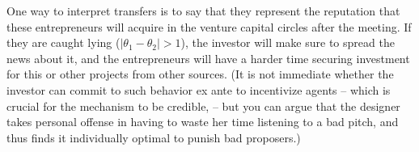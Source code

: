 \documentclass[a4paper]{article}
\begin{document}
\begin{enumerate}
	One way to interpret transfers is to say that they represent the reputation that these entrepreneurs will acquire in the venture capital circles after the meeting. If they are caught lying ($|\theta_1 - \theta_2|>1$), the investor will make sure to spread the news about it, and the entrepreneurs will have a harder time securing investment for this or other projects from other sources. 
	(It is not immediate whether the investor can commit to such behavior ex ante to incentivize agents -- which is crucial for the mechanism to be credible, -- but you can argue that the designer takes personal offense in having to waste her time listening to a bad pitch, and thus finds it individually optimal to punish bad proposers.)
\end{enumerate}
\fi 
\end{document}
